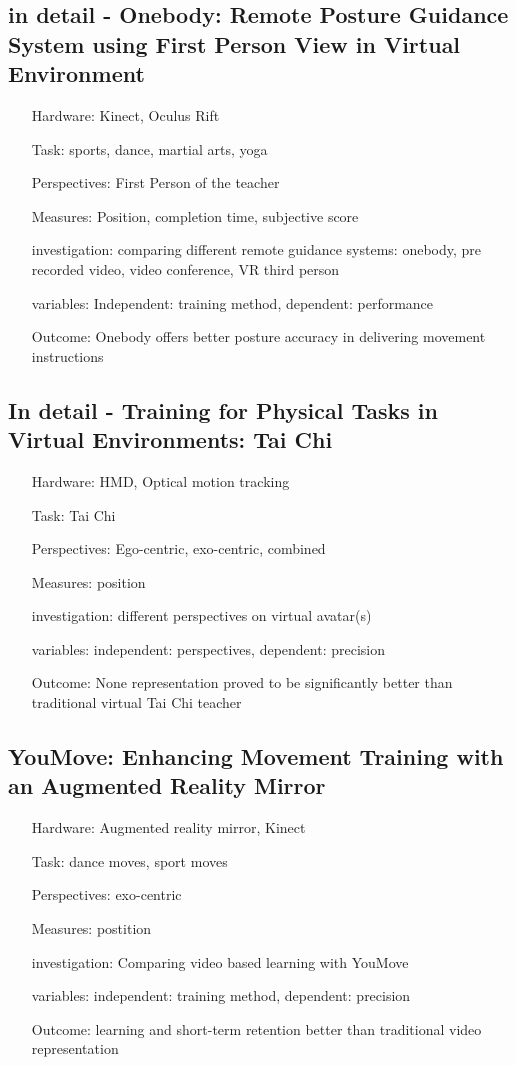 \subsection{in detail - Onebody: Remote Posture Guidance System using First Person View in Virtual Environment}
\begin{itemize}
	\item[Hardware:] Kinect, Oculus Rift
	\item[Task:] sports, dance, martial arts, yoga
	\item[Perspectives:] First Person of the teacher
	\item[Measures:] Position, completion time, subjective score
	\item[investigation:] comparing different remote guidance systems: onebody, pre recorded video, video conference, VR third person
	\item[variables:] Independent: training method, dependent: performance
	\item[Outcome:] Onebody offers better posture accuracy in delivering movement instructions
\end{itemize}

\subsection{In detail - Training for Physical Tasks in Virtual Environments: Tai Chi}
\begin{itemize}
	\item[Hardware:] HMD, Optical motion tracking
	\item[Task:] Tai Chi
	\item[Perspectives:] Ego-centric, exo-centric, combined
	\item[Measures:] position
	\item[investigation:] different perspectives on virtual avatar(s)
	\item[variables:] independent: perspectives, dependent: precision
	\item[Outcome:] None representation proved to be significantly better than traditional virtual Tai Chi teacher 
\end{itemize}

\subsection{YouMove: Enhancing Movement Training with an Augmented Reality Mirror}
\begin{itemize}
	\item[Hardware:] Augmented reality mirror, Kinect
	\item[Task:] dance moves, sport moves
	\item[Perspectives:] exo-centric
	\item[Measures:] postition
	\item[investigation:] Comparing video based learning with YouMove
	\item[variables:] independent: training method, dependent: precision
	\item[Outcome:] learning and short-term retention better than traditional video representation
\end{itemize}

